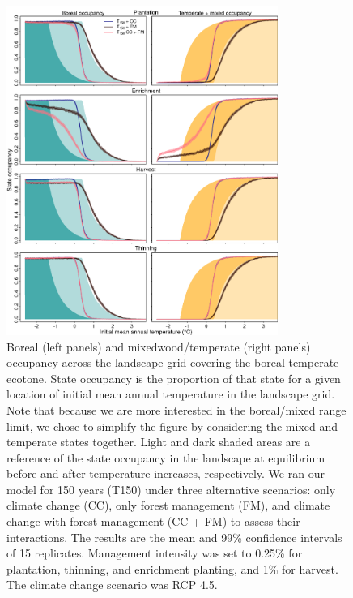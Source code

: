 \hypertarget{fig:sim-result}{%
\begin{figure}
\centering
\includegraphics[width=0.79\textwidth,height=\textheight]{manuscript/img/sim-result_RCP4.5.png}
\caption[{Boreal (left panels) and mixedwood/temperate (right panels)
occupancy across the landscape grid covering the boreal-temperate
ecotone.}]{Boreal (left panels) and mixedwood/temperate (right panels)
occupancy across the landscape grid covering the boreal-temperate
ecotone. State occupancy is the proportion of that state for a given
location of initial mean annual temperature in the landscape grid. Note
that because we are more interested in the boreal/mixed range limit, we
chose to simplify the figure by considering the mixed and temperate
states together. Light and dark shaded areas are a reference of the
state occupancy in the landscape at equilibrium before and after
temperature increases, respectively. We ran our model for 150 years
(T150) under three alternative scenarios: only climate change (CC), only
forest management (FM), and climate change with forest management (CC +
FM) to assess their interactions. The results are the mean and 99\%
confidence intervals of 15 replicates. Management intensity was set to
0.25\% for plantation, thinning, and enrichment planting, and 1\% for
harvest. The climate change scenario was RCP 4.5.}
\label{fig:sim-result}
\end{figure}
}

